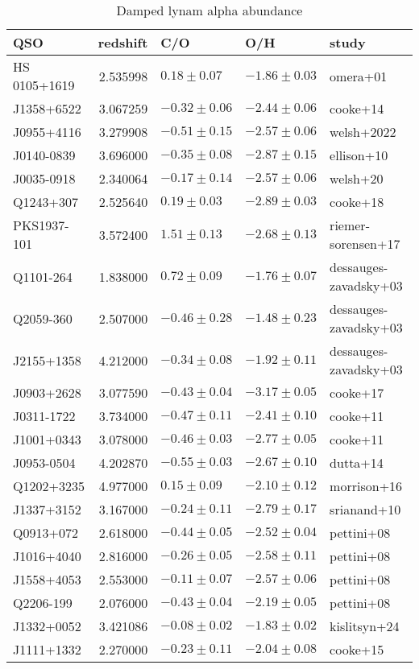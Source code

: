 \documentclass[11pt]{article}
\begin{document}
\begin{table}
    \caption{Damped lynam alpha abundance}
    \centering
    \begin{tabular}{lrlll}
    \hline
    QSO & redshift & C/O & O/H & study \\
    \hline
    HS 0105+1619 & 2.535998 & $0.18 \pm 0.07$ & $-1.86 \pm 0.03$ & omera+01 \\
    J1358+6522 & 3.067259 & $-0.32 \pm 0.06$ & $-2.44 \pm 0.06$ & cooke+14 \\
    J0955+4116 & 3.279908 & $-0.51 \pm 0.15$ & $-2.57 \pm 0.06$ & welsh+2022 \\
    J0140-0839 & 3.696000 & $-0.35 \pm 0.08$ & $-2.87 \pm 0.15$ & ellison+10 \\
    J0035-0918 & 2.340064 & $-0.17 \pm 0.14$ & $-2.57 \pm 0.06$ & welsh+20 \\
    Q1243+307 & 2.525640 & $0.19 \pm 0.03$ & $-2.89 \pm 0.03$ & cooke+18 \\
    PKS1937-101 & 3.572400 & $1.51 \pm 0.13$ & $-2.68 \pm 0.13$ & riemer-sorensen+17 \\
    Q1101-264 & 1.838000 & $0.72 \pm 0.09$ & $-1.76 \pm 0.07$ & dessauges-zavadsky+03 \\
    Q2059-360 & 2.507000 & $-0.46 \pm 0.28$ & $-1.48 \pm 0.23$ & dessauges-zavadsky+03 \\
    J2155+1358 & 4.212000 & $-0.34 \pm 0.08$ & $-1.92 \pm 0.11$ & dessauges-zavadsky+03 \\
    J0903+2628 & 3.077590 & $-0.43 \pm 0.04$ & $-3.17 \pm 0.05$ & cooke+17 \\
    J0311-1722 & 3.734000 & $-0.47 \pm 0.11$ & $-2.41 \pm 0.10$ & cooke+11 \\
    J1001+0343 & 3.078000 & $-0.46 \pm 0.03$ & $-2.77 \pm 0.05$ & cooke+11 \\
    J0953-0504 & 4.202870 & $-0.55 \pm 0.03$ & $-2.67 \pm 0.10$ & dutta+14 \\
    Q1202+3235 & 4.977000 & $0.15 \pm 0.09$ & $-2.10 \pm 0.12$ & morrison+16 \\
    J1337+3152 & 3.167000 & $-0.24 \pm 0.11$ & $-2.79 \pm 0.17$ & srianand+10 \\
    Q0913+072 & 2.618000 & $-0.44 \pm 0.05$ & $-2.52 \pm 0.04$ & pettini+08 \\
    J1016+4040 & 2.816000 & $-0.26 \pm 0.05$ & $-2.58 \pm 0.11$ & pettini+08 \\
    J1558+4053 & 2.553000 & $-0.11 \pm 0.07$ & $-2.57 \pm 0.06$ & pettini+08 \\
    Q2206-199 & 2.076000 & $-0.43 \pm 0.04$ & $-2.19 \pm 0.05$ & pettini+08 \\
    J1332+0052 & 3.421086 & $-0.08 \pm 0.02$ & $-1.83 \pm 0.02$ & kislitsyn+24 \\
    J1111+1332 & 2.270000 & $-0.23 \pm 0.11$ & $-2.04 \pm 0.08$ & cooke+15 \\
    \hline
    \end{tabular}
\end{table}
\end{document}
